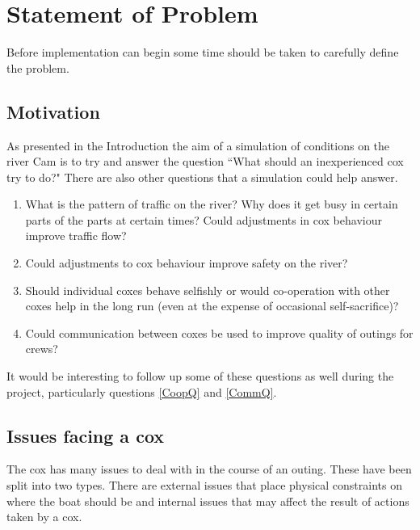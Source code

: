 \chapter{Statement of Problem}

Before implementation can begin some time should be taken to carefully define the problem.

\section{Motivation}

As presented in the Introduction the aim of a simulation of conditions
on the river Cam is to try and answer the question ``What should an
inexperienced cox try to do?" There are also other questions that a simulation could help answer.

\begin{enumerate}
  \item What is the pattern of traffic on the river? Why does it get busy in certain parts of the parts at certain times? Could adjustments in cox behaviour improve traffic flow?
  \item Could adjustments to cox behaviour improve safety on the river?
  \item \label{CoopQ} Should individual coxes behave selfishly or would co-operation with other coxes help in the long run (even at the expense of occasional self-sacrifice)?
  \item \label{CommQ} Could communication between coxes be used to improve quality of outings for crews?
\end{enumerate}

It would be interesting to follow up some of these questions as well during the project, particularly questions \ref{CoopQ} and \ref{CommQ}.

\section{Issues facing a cox}
The cox has many issues to deal with in the course of an outing. These
have been split into two types. There are external issues that place
physical constraints on where the boat should be and internal issues
that may affect the result of actions taken by a cox. 


